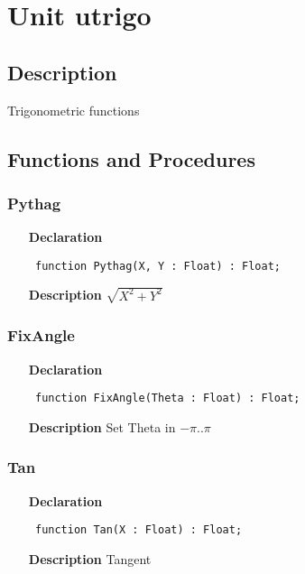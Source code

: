 \documentclass[12pt,a4paper,oneside]{report}
\newcommand{\declarationitem}[1]{\textbf{#1}}
\newcommand{\descriptiontitle}[1]{\textbf{#1}}
\newcommand{\code}[1]{\texttt{#1}}
\begin{document}
\section{Unit utrigo}
\label{utrigo}
\subsection{Description}
Trigonometric functions 
\subsection{Functions and Procedures}
\subsubsection{Pythag}
\label{utrigo-Pythag}
\begin{itemize}\item[\declarationitem{Declaration}\hfill]
	\begin{flushleft}
		\code{
			function Pythag(X, Y : Float) : Float;}
		
	\end{flushleft}
	
	\par
	\item[\descriptiontitle{Description}]
	$\sqrt{X^2+Y^2}$
	
\end{itemize}
\subsubsection{FixAngle}
\label{utrigo-FixAngle}
\begin{itemize}\item[\declarationitem{Declaration}\hfill]
	\begin{flushleft}
		\code{
			function FixAngle(Theta : Float) : Float;}
		
	\end{flushleft}
	
	\par
	\item[\descriptiontitle{Description}]
	Set Theta in $-\pi..\pi$
	
\end{itemize}
\subsubsection{Tan}
\label{utrigo-Tan}
\begin{itemize}\item[\declarationitem{Declaration}\hfill]
	\begin{flushleft}
		\code{
			function Tan(X : Float) : Float;}
		
	\end{flushleft}
	
	\par
	\item[\descriptiontitle{Description}]
	Tangent
	
\end{itemize}
\end{document}

